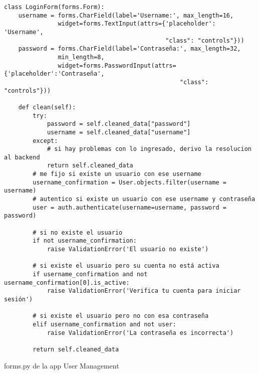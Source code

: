 \begin{listing}[H]
\begin{verbatim}
class LoginForm(forms.Form):
    username = forms.CharField(label='Username:', max_length=16,
               widget=forms.TextInput(attrs={'placeholder': 'Username', 
                                             "class": "controls"}))
    password = forms.CharField(label='Contraseña:', max_length=32, 
               min_length=8, 
               widget=forms.PasswordInput(attrs={'placeholder':'Contraseña', 
                                                 "class": "controls"}))

    def clean(self):
        try:
            password = self.cleaned_data["password"]
            username = self.cleaned_data["username"]
        except:
            # si hay problemas con lo ingresado, derivo la resolucion al backend
            return self.cleaned_data
        # me fijo si existe un usuario con ese username
        username_confirmation = User.objects.filter(username = username)
        # autentico si existe un usuario con ese username y contraseña
        user = auth.authenticate(username=username, password = password)

        # si no existe el usuario
        if not username_confirmation:
            raise ValidationError('El usuario no existe')

        # si existe el usuario pero su cuenta no está activa
        if username_confirmation and not username_confirmation[0].is_active:
            raise ValidationError('Verifica tu cuenta para iniciar sesión')
        
        # si existe el usuario pero no con esa contraseña
        elif username_confirmation and not user:
            raise ValidationError('La contraseña es incorrecta')
        
        return self.cleaned_data
\end{verbatim}
\caption{forms.py de la app User Management}
\label{forms.py_user_mngmnt}
\end{listing}


